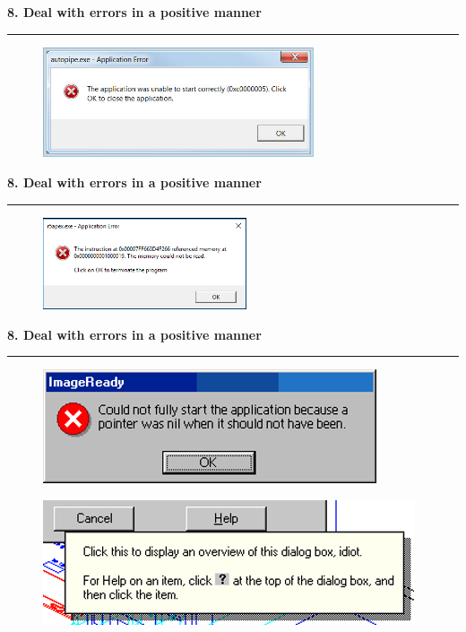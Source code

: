 \documentclass[pdf]{beamer}
\begin{document}
\begin{frame}
{\textbf{8. Deal with errors in a positive manner}}{\textcolor{red}{\rule{12cm}{1.2pt}}}

\begin{figure}[H]
	\centering
	\includegraphics[width=8cm]{error1.png}
\end{figure}
\end{frame}



\begin{frame}
{\textbf{8. Deal with errors in a positive manner}}{\textcolor{red}{\rule{12cm}{1.2pt}}}

\begin{figure}[H]
	\centering
	\includegraphics[width=6cm]{error2.png}
\end{figure}
\end{frame}



\begin{frame}
{\textbf{8. Deal with errors in a positive manner}}{\textcolor{red}{\rule{12cm}{1.2pt}}}

\begin{figure}[H]  
	\includegraphics[scale=0.7]{46_Picture4.png} 
\end{figure}

\begin{figure}[H]  
    \includegraphics[scale=0.7]{46_Picture5.png} 
\end{figure}

\end{frame}
\end{document}
